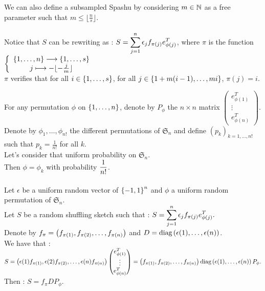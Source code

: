  We can also define a subsampled Spashu by considering $m \in {\mathbb N}$ as a free parameter such that $m \leq \lfloor \frac{n}{s} \rfloor.$\\\\
 
 
Notice that $S$ can be rewriting as : $S = \displaystyle\sum_{j=1}^{n} \epsilon_{j}f_{\pi(j)}e_{\phi(j)}^{T} $, where $\pi$ is the function $\left\{\begin{array}{c}\left\{1,\dots,n\right\}\longrightarrow \left\{1,\dots,s\right\}\\ j \longmapsto -\lfloor -\frac{j}{m} \rfloor\end{array}\right.$\\
 
 $\pi$ verifies that for all $i \in \left\{1,\dots,s\right\}$, for all $j \in \left\{1+m (i-1),\dots,m i\right\}$, $\pi(j) = i. $
 
 For any permutation $\phi$ on $\left\{1,\dots,n\right\}$, denote by $P_{\phi}$ the $n\times n$ matrix $ \begin{pmatrix} e_{\phi(1)}^{T} \\ \vdots \\ e_{\phi(n)}^{T} \end{pmatrix} $.\\
 Denote by $\phi_{1},\dots,\phi_{n!}$ the different permutations of $\mathfrak{S}_{n}$ and define $(p_{k})_{k=1,\dots,n!}$ such that $p_{k} = \frac{1}{n!}$ for all $k$.\\ Let's consider that uniform probability on $\mathfrak{S}_{n}$.\\ Then $\phi = \phi_{k}$ with probability $\displaystyle \frac{1}{n!}$.\\\\
 
 Let $\epsilon$ be a uniform random vector of $\left\{-1,1\right\}^{n}$ and $\phi$ a uniform random permutation of $\mathfrak{S}_{n}$.\\
Let $S$ be a random shuffling sketch such that : $S = \displaystyle\sum_{j=1}^{n} \epsilon_{j}f_{\pi(j)}e_{\phi(j)}^{T} .$\\

Denote by $f_{\pi} = \left( f_{\pi(1)}, f_{\pi(2)},\dots, f_{\pi(n)} \right)$ and $D = \text{diag}\left(\epsilon(1),\dots,\epsilon(n)\right)$.\\
We have that :\\
$S = \left( \epsilon(1)f_{\pi(1)},\epsilon(2)f_{\pi(2)},\dots,\epsilon(n)f_{\pi(n)} \right) \begin{pmatrix} e_{\phi(1)}^{T} \\ \vdots \\ e_{\phi(n)}^{T} \end{pmatrix} = \left( f_{\pi(1)}, f_{\pi(2)},\dots, f_{\pi(n)} \right) \text{diag}\left(\epsilon(1),\dots,\epsilon(n)\right) P_{\phi}.$\\
Then : $S = f_{\pi} D P_{\phi}$.\\

